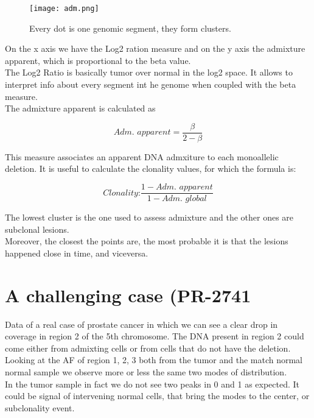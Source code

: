 \begin{wrapfigure}{l}{0.5\textwidth}
	\texttt{[image: adm.png]}
	\caption{\label{fig:adm} Every dot is one genomic segment, they form clusters.  }
\end{wrapfigure}

On the x axis we have the Log2 ration measure and on the y axis the admixture apparent, which is proportional to the beta  value.\\
The Log2 Ratio is basically tumor over normal in the log2 space. It allows to interpret info about every segment int he genome when coupled with the beta measure.
\\
The admixture apparent is calculated as

\begin{equation} \label{eq:adm}
\textit{Adm. apparent} = \frac{\beta}{2-\beta}
\end{equation}

This measure associates an apparent DNA admxiture to each monoallelic deletion. It is useful to calculate the clonality values, for which the formula is:

\begin{equation}
\textit{Clonality:} \frac{1 - \textit{Adm. apparent}}{1 - \textit{Adm. global}}
\end{equation}

The lowest cluster is the one used to assess admixture and the other ones are subclonal lesions.\\
Moreover, the closest the points are, the most probable it is that the lesions happened close in time, and viceversa.

\section{A challenging case (PR-2741}
Data of a real case of prostate cancer in which we can see a clear drop in coverage in region 2 of the 5th chromosome. The DNA present in region 2 could come either from admixting cells or from cells that do not have the deletion. \\
Looking at the AF of region 1, 2, 3 both from the tumor and the match normal normal sample we observe more or less the same two modes of distribution.\\
In the tumor sample in fact we do not see two peaks in 0 and 1 as expected. It could be signal of intervening normal cells, that bring the modes to the center, or subclonality event. \\
